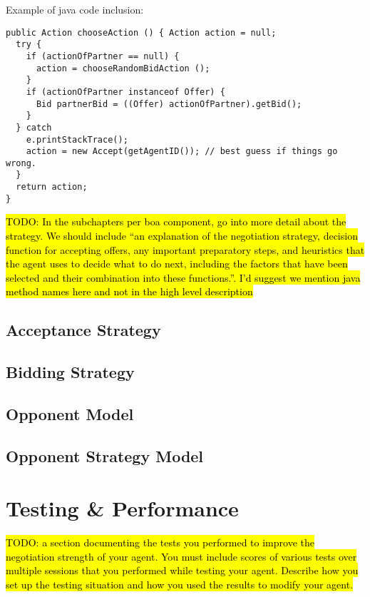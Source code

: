 \documentclass[a4paper,10pt]{article}
\newcommand{\todo}[1] {\hl{TODO: #1}}
\begin{document}
Example of java code inclusion:
\begin{lstlisting}
public Action chooseAction () { Action action = null;
  try {
    if (actionOfPartner == null) {
      action = chooseRandomBidAction ();
    }
    if (actionOfPartner instanceof Offer) {
      Bid partnerBid = ((Offer) actionOfPartner).getBid();
    }
  } catch
    e.printStackTrace();
    action = new Accept(getAgentID()); // best guess if things go wrong.
  }
  return action; 
}
\end{lstlisting}

\todo{In the subchapters per boa component, go into more detail about the strategy. We should include ``an explanation of the negotiation strategy, decision function for accepting offers, any important preparatory steps, and heuristics that the agent uses to decide what to do next, including the factors that have been selected and their combination into these functions.''.
I'd suggest we mention java method names here and not in the high level description}

\subsection{Acceptance Strategy}
\label{sec:strategyAS}

\subsection{Bidding Strategy}
\label{sec:strategyBS}

\subsection{Opponent Model}
\label{sec:strategyOM}

\subsection{Opponent Strategy Model}
\label{sec:strategyOMS}

\section{Testing \& Performance}
\label{sec:performance}
\todo{a section documenting the tests you performed to improve the negotiation strength of your agent. You must include scores of various tests over multiple sessions that you performed while testing your agent. Describe how you set up the testing situation and how you used the results to modify your agent.}
\end{document}
